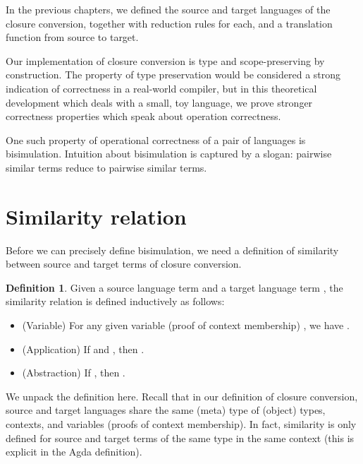 \documentclass[bsc,frontabs,twoside,singlespacing,parskip,deptreport]{infthesis}
\theoremstyle{definition}
\newtheorem*{definition}{Definition}
\begin{document}
In the previous chapters, we defined the source and target languages
of the closure conversion, together with reduction rules for each, and
a translation function from source to target.

Our implementation of closure conversion is type and scope-preserving
by construction. The property of type preservation would be considered
a strong indication of correctness in a real-world compiler, but in
this theoretical development which deals with a small, toy language,
we prove stronger correctness properties which speak about operation
correctness.

One such property of operational correctness of a pair of languages is
bisimulation. Intuition about bisimulation is captured by a slogan:
pairwise similar terms reduce to pairwise similar terms. 

\section{Similarity relation}

Before we can precisely define
bisimulation, we need a definition of similarity between source
and target terms of closure conversion.


\begin{definition}
  Given a source language term  and a target language term ,
  the similarity relation  is defined inductively as
  follows:

  \begin{itemize}
  \item
    (Variable) For any given variable (proof of context membership) , we have
    .

  \item
    (Application) If  and ,
    then .

  \item
    (Abstraction) If ,
    then .
  \end{itemize}
\end{definition}

We unpack the definition here. Recall that in our definition of
closure conversion, source and target languages share the same (meta)
type of (object) types, contexts, and variables (proofs of context
membership). In fact, similarity is only defined for source and target
terms of the same type in the same context (this is explicit in the Agda
definition). 
\end{document}
